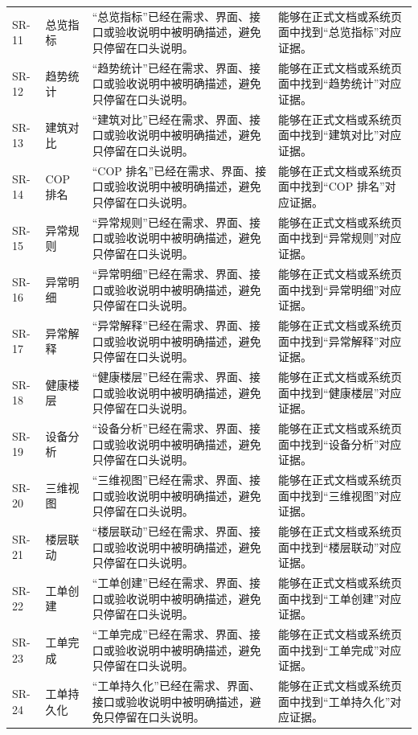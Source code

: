 \documentclass[12pt,a4paper]{ctexart}
\begin{document}
\begin{longtable}{L{1.7cm}L{3.0cm}L{6.2cm}L{4.4cm}}
SR-11 & 总览指标 & “总览指标”已经在需求、界面、接口或验收说明中被明确描述，避免只停留在口头说明。 & 能够在正式文档或系统页面中找到“总览指标”对应证据。 \\
SR-12 & 趋势统计 & “趋势统计”已经在需求、界面、接口或验收说明中被明确描述，避免只停留在口头说明。 & 能够在正式文档或系统页面中找到“趋势统计”对应证据。 \\
SR-13 & 建筑对比 & “建筑对比”已经在需求、界面、接口或验收说明中被明确描述，避免只停留在口头说明。 & 能够在正式文档或系统页面中找到“建筑对比”对应证据。 \\
SR-14 & COP 排名 & “COP 排名”已经在需求、界面、接口或验收说明中被明确描述，避免只停留在口头说明。 & 能够在正式文档或系统页面中找到“COP 排名”对应证据。 \\
SR-15 & 异常规则 & “异常规则”已经在需求、界面、接口或验收说明中被明确描述，避免只停留在口头说明。 & 能够在正式文档或系统页面中找到“异常规则”对应证据。 \\
SR-16 & 异常明细 & “异常明细”已经在需求、界面、接口或验收说明中被明确描述，避免只停留在口头说明。 & 能够在正式文档或系统页面中找到“异常明细”对应证据。 \\
SR-17 & 异常解释 & “异常解释”已经在需求、界面、接口或验收说明中被明确描述，避免只停留在口头说明。 & 能够在正式文档或系统页面中找到“异常解释”对应证据。 \\
SR-18 & 健康楼层 & “健康楼层”已经在需求、界面、接口或验收说明中被明确描述，避免只停留在口头说明。 & 能够在正式文档或系统页面中找到“健康楼层”对应证据。 \\
SR-19 & 设备分析 & “设备分析”已经在需求、界面、接口或验收说明中被明确描述，避免只停留在口头说明。 & 能够在正式文档或系统页面中找到“设备分析”对应证据。 \\
SR-20 & 三维视图 & “三维视图”已经在需求、界面、接口或验收说明中被明确描述，避免只停留在口头说明。 & 能够在正式文档或系统页面中找到“三维视图”对应证据。 \\
SR-21 & 楼层联动 & “楼层联动”已经在需求、界面、接口或验收说明中被明确描述，避免只停留在口头说明。 & 能够在正式文档或系统页面中找到“楼层联动”对应证据。 \\
SR-22 & 工单创建 & “工单创建”已经在需求、界面、接口或验收说明中被明确描述，避免只停留在口头说明。 & 能够在正式文档或系统页面中找到“工单创建”对应证据。 \\
SR-23 & 工单完成 & “工单完成”已经在需求、界面、接口或验收说明中被明确描述，避免只停留在口头说明。 & 能够在正式文档或系统页面中找到“工单完成”对应证据。 \\
SR-24 & 工单持久化 & “工单持久化”已经在需求、界面、接口或验收说明中被明确描述，避免只停留在口头说明。 & 能够在正式文档或系统页面中找到“工单持久化”对应证据。 \\

\end{longtable}
\end{document}
